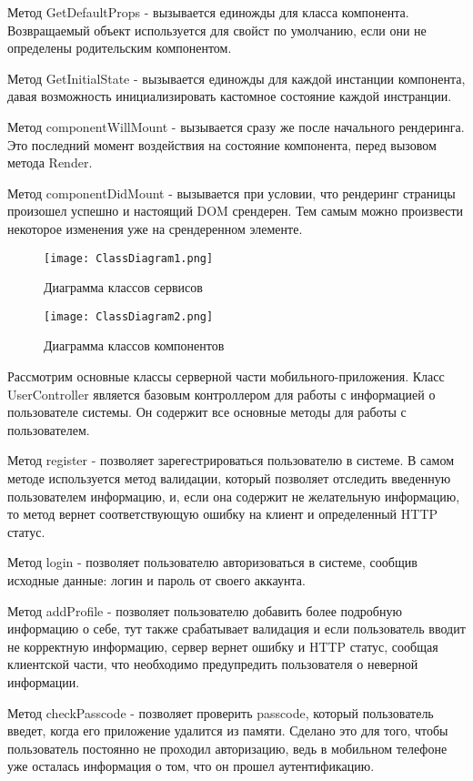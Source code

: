 Метод GetDefaultProps - вызывается единожды для класса компонента. Возвращаемый объект используется для свойст по умолчанию, если они не определены родительским компонентом.

Метод GetInitialState - вызывается единожды для каждой инстанции компонента, давая возможность инициализировать кастомное состояние каждой инстранции.

Метод componentWillMount - вызывается сразу же после начального рендеринга. Это последний момент воздействия на состояние компонента, перед вызовом метода Render.

Метод componentDidMount - вызывается при условии, что рендеринг страницы произошел успешно и настоящий DOM срендерен. Тем самым можно произвести некоторое изменения уже на срендеренном элементе.
\begin{figure}[ht]
\centering
  \texttt{[image: ClassDiagram1.png]}  
  \caption{ Диаграмма классов сервисов }
  \label{fig:domain:manual_structure:client_class}
\end{figure}
\begin{figure}[ht]
\centering
  \texttt{[image: ClassDiagram2.png]}  
  \caption{ Диаграмма классов компонентов }
  \label{fig:domain:manual_structure:client_class}
\end{figure}
Рассмотрим основные классы серверной части мобильного-приложения. Класс UserController является базовым контроллером для работы с информацией о пользователе системы. Он содержит все основные методы для работы с пользователем.

Метод register - позволяет зарегестрироваться пользователю в системе. В самом методе используется метод валидации, который позволяет отследить введенную пользователем информацию, и, если она содержит не желательную информацию, то метод вернет соответствующую ошибку на клиент и определенный HTTP статус.

Метод login - позволяет пользователю авторизоваться в системе, сообщив исходные данные: логин и пароль от своего аккаунта.

Метод addProfile - позволяет пользователю добавить более подробную информацию о себе, тут также срабатывает валидация и если пользователь вводит не корректную информацию, сервер вернет ошибку и HTTP статус, сообщая клиентской части, что необходимо предупредить пользователя о неверной информации.

Метод checkPasscode - позволяет проверить passcode, который пользователь введет, когда его приложение удалится из памяти. Сделано это для того, чтобы пользователь постоянно не проходил авторизацию, ведь в мобильном телефоне уже осталась информация о том, что он прошел аутентификацию.

